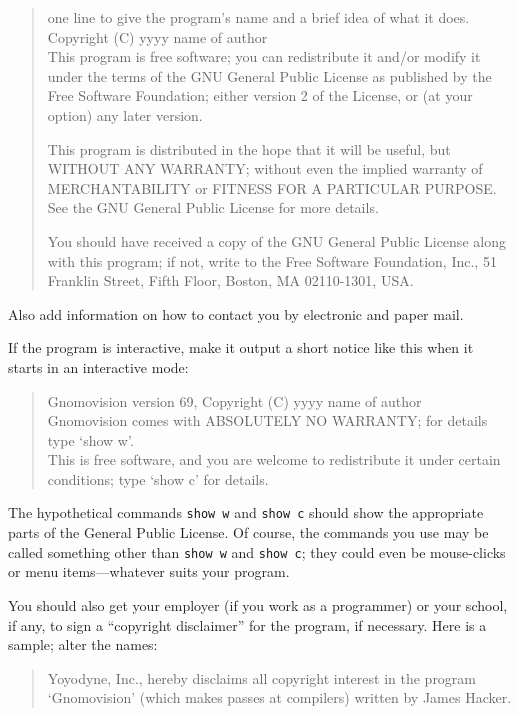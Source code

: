\begin{lrbox}{\gpl}
\begin{minipage}{3\textwidth}
\begin{multicols}{3}
\begin{quote}
one line to give the program's name and a brief idea of what it does. \\
Copyright (C) yyyy  name of author \\

This program is free software; you can redistribute it and/or modify
it under the terms of the GNU General Public License as published by
the Free Software Foundation; either version 2 of the License, or
(at your option) any later version.

This program is distributed in the hope that it will be useful,
but WITHOUT ANY WARRANTY; without even the implied warranty of
MERCHANTABILITY or FITNESS FOR A PARTICULAR PURPOSE.  See the
GNU General Public License for more details.

You should have received a copy of the GNU General Public License
along with this program; if not, write to the Free Software
Foundation, Inc., 51 Franklin Street, Fifth Floor, Boston, MA  02110-1301, USA.
\end{quote}

Also add information on how to contact you by electronic and paper mail.

If the program is interactive, make it output a short notice like this
when it starts in an interactive mode:

\begin{quote}
Gnomovision version 69, Copyright (C) yyyy  name of author \\
Gnomovision comes with ABSOLUTELY NO WARRANTY; for details type `show w'. \\
This is free software, and you are welcome to redistribute it
under certain conditions; type `show c' for details.
\end{quote}


The hypothetical commands {\tt show w} and {\tt show c} should show the
appropriate parts of the General Public License.  Of course, the commands
you use may be called something other than {\tt show w} and {\tt show c};
they could even be mouse-clicks or menu items---whatever suits your
program.

You should also get your employer (if you work as a programmer) or your
school, if any, to sign a ``copyright disclaimer'' for the program, if
necessary.  Here is a sample; alter the names:

\begin{quote}
Yoyodyne, Inc., hereby disclaims all copyright interest in the program \\
`Gnomovision' (which makes passes at compilers) written by James Hacker. \\


\end{quote}
\end{multicols}
\end{minipage}
\end{lrbox}
